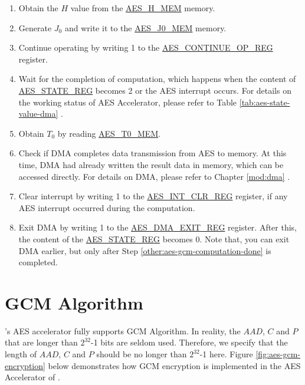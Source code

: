 \documentclass[main\_\_EN.tex]{subfiles}
\begin{document}
\begin{enumerate}
    \item Obtain the $H$ value from the \hyperref[memdesc:AESHMEM]{AES\_H\_MEM} memory.
    \item Generate $J_0$ and write it to the \hyperref[memdesc:AESJ0MEM]{AES\_J0\_MEM} memory.
    \item Continue operating by writing 1 to the \hyperref[regdesc:AESCONTINUEOPREG]{AES\_CONTINUE\_OP\_REG} register.
    \item \label{other:aes-gcm-computation-done} Wait for the completion of computation, which happens when the content of \hyperref[regdesc:AESSTATEREG]{AES\_STATE\_REG} becomes 2 or the AES interrupt occurs. For details on the working status of AES Accelerator, please refer to Table \ref{tab:aes-state-value-dma} \textit{}.
    \item Obtain $T_0$ by reading \hyperref[memdesc:AEST0MEM]{AES\_T0\_MEM}.
    \item Check if DMA completes data transmission from AES to memory. At this time, DMA had already written the result data in memory, which can be accessed directly. For details on DMA, please refer to Chapter \ref{mod:dma} \textit{}.
    \item Clear interrupt by writing 1 to the \hyperref[regdesc:AESINTCLRREG]{AES\_INT\_CLR\_REG} register, if any AES interrupt occurred during the computation.
    \item Exit DMA by writing 1 to the \hyperref[regdesc:AESDMAEXITREG]{AES\_DMA\_EXIT\_REG} register. After this, the content of the \hyperref[regdesc:AESSTATEREG]{AES\_STATE\_REG} becomes 0. Note that, you can exit DMA earlier, but only after Step \ref{other:aes-gcm-computation-done} is completed.
\end{enumerate}


\section{GCM Algorithm}\label{sec:aes-gcm-algorithm}

\chipname{}'s AES accelerator fully supports GCM Algorithm. In reality, the \begin{math}AAD\end{math}, \begin{math}C\end{math} and \begin{math}P\end{math} that are longer than \begin{math}2^{32}\end{math}-1 bits are seldom used. Therefore, we specify that the length of \begin{math}AAD\end{math}, \begin{math}C\end{math} and \begin{math}P\end{math} should be no longer than \begin{math}2^{32}\end{math}-1 here.
Figure \ref{fig:aes-gcm-encryption} below demonstrates how GCM encryption is implemented in the AES Accelerator of \chipname{}.
\end{document}
